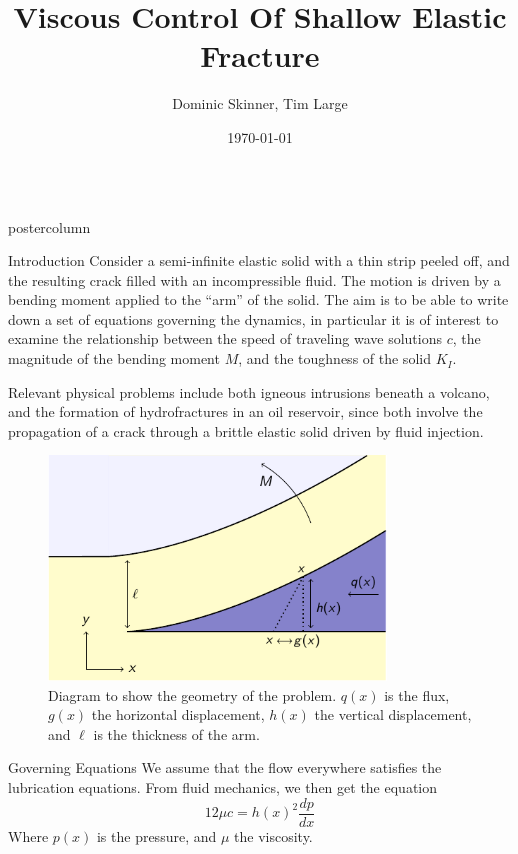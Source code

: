 \documentclass{beamer}
\title{\huge Viscous Control Of Shallow Elastic Fracture}
\author{Dominic Skinner, Tim Large}
\institute[Univerity of Cambridge]
{DAMTP, University of Cambridge}
\date{\today}
\newlength{\columnheight}
\begin{document}
\begin{frame}
\begin{columns}
	\begin{column}{.43\textwidth}
		\begin{beamercolorbox}[center]{postercolumn}
			\begin{minipage}{.98\textwidth}  %
				\parbox[t][\columnheight]{\textwidth}{ %
\begin{myblock}{Introduction}
Consider a semi-infinite elastic solid with a thin strip peeled off, and the
resulting crack filled with an incompressible fluid. The motion is driven
by a bending moment applied to the ``arm'' of the solid. The aim is to be
able to write down a set of equations governing the dynamics, in particular
it is of interest to examine the relationship between the speed of traveling
wave solutions $c$, the magnitude of the bending moment $M$, and the toughness 
of the solid $K_I$. 

Relevant physical problems include both igneous intrusions beneath a volcano,
and the formation of hydrofractures in an oil
reservoir, since both involve the propagation of a crack through a brittle 
elastic solid driven by fluid injection.

\begin{figure}
\centering\includegraphics[width=0.8\textwidth]{Fig10.pdf}
\caption{Diagram to show the geometry of the problem. $q(x)$ is the flux,
$g(x)$ the horizontal displacement, $h(x)$ the vertical displacement, and
$\ell$ is the thickness of the arm.}
\end{figure}
\end{myblock}\vfill
\begin{myblock}{Governing Equations}
We assume that the flow everywhere satisfies the lubrication equations. From 
fluid mechanics, we then get the equation
\[12\mu c = h(x)^2 \frac{dp}{dx}\]
Where $p(x)$ is the pressure, and $\mu$ the viscosity.


\end{myblock}}
\end{minipage}
\end{beamercolorbox}
\end{column}
\end{columns}
\end{frame}
\end{document}
